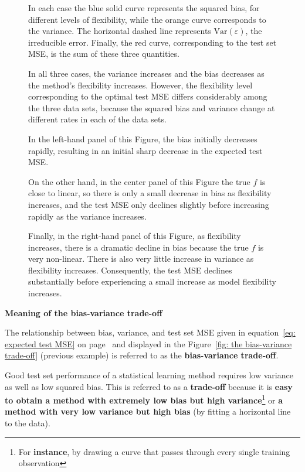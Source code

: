 \documentclass[a4paper]{article}
\newcommand{\definition}[1]{\textcolor{Red3}{\textbf{#1}}\index{#1}}
\newcommand{\example}[1]{\textcolor{Green4}{\textbf{#1}}}
\newcommand{\Var}{\mathrm{Var}}
\newcommand{\highspace}{\vspace{1.2em}\noindent}
\begin{document}
\begin{figure}[!htp]
\begin{examplebox}
            In each case the blue solid curve represents the squared bias, for different levels of flexibility, while the orange curve corresponds to the variance. The horizontal dashed line represents $\Var\left(\varepsilon\right)$, the irreducible error. Finally, the red curve, corresponding to the test set MSE, is the sum of these three quantities. 
            
            \highspace
            In all three cases, the variance increases and the bias decreases as the method's flexibility increases. However, the flexibility level corresponding to the optimal test MSE differs considerably among the three data sets, because the squared bias and variance change at different rates in each of the data sets. 
            
            \highspace
            In the left-hand panel of this Figure, the bias initially decreases rapidly, resulting in an initial sharp decrease in the expected test MSE. 
            
            \highspace
            On the other hand, in the center panel of this Figure the true $f$ is close to linear, so there is only a small decrease in bias as flexibility increases, and the test MSE only declines slightly before increasing rapidly as the variance increases. 
            
            \highspace
            Finally, in the right-hand panel of this Figure, as flexibility increases, there is a dramatic decline in bias because the true $f$ is very non-linear. There is also very little increase in variance as flexibility increases. Consequently, the test MSE declines substantially before experiencing a small increase as model flexibility increases.
        \end{examplebox}
    \end{figure}

    \newpage

    \begin{flushleft}
        \textcolor{Red2}{ \textbf{Meaning of the bias-variance trade-off}}
    \end{flushleft}
    The relationship between bias, variance, and test set MSE given in equation~\ref{eq: expected test MSE} on page~\pageref{eq: expected test MSE} and displayed in the Figure~\ref{fig: the bias-variance trade-off} (previous example) is referred to as the \definition{bias-variance trade-off}. 
    
    \highspace
    Good test set performance of a statistical learning method requires low variance as well as low squared bias. This is referred to as a \textbf{trade-off} because it is \textbf{easy to obtain a method with extremely low bias but high variance}\footnote{For \example{instance}, by drawing a curve that passes through every single training observation} or \textbf{a method with very low variance but high bias} (by fitting a horizontal line to the data).
    
\end{document}
